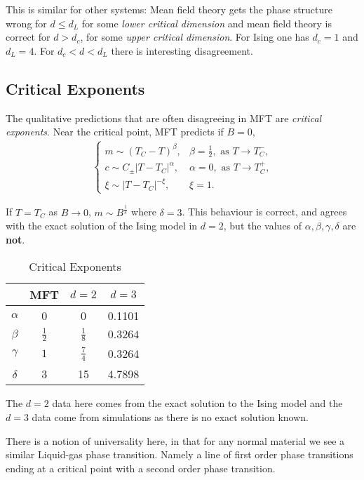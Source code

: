 This is similar for other systems: Mean field theory gets the phase structure wrong for $d \leq d_L$ for some \textit{lower critical dimension} and mean field theory is correct for $d > d_{c}$, for some \textit{upper critical dimension}. For Ising one has $d_c = 1$ and $d_L = 4$. For $d_c < d < d_L$ there is interesting disagreement.

\subsection{Critical Exponents}


The qualitative predictions that are often disagreeing in MFT are \textit{critical exponents}. Near the critical point, MFT predicts if $B = 0$,
\begin{align}
    \begin{cases}
        m \sim  \left( T_C - T \right)^{\beta}, & \beta = \frac{1}{2}, \text{~as $T \to T_C^{-}$,} \\
        c \sim C_{\pm} \left| T - T_C \right|^{\alpha}, & \alpha = 0, \text{~as $T \to T_C^{+}$,}\\
        \xi \sim  \left| T - T_C \right|^{-\xi}, & \xi = 1. 
    \end{cases}
\end{align}

If $T = T_C$ as $B \to 0$, $m \sim  B^{\frac{1}{\delta}}$ where $\delta = 3$. This behaviour is correct, and agrees with the exact solution of the Ising model in $d = 2$, but the values of $\alpha , \beta , \gamma, \delta$ are \textbf{not}.

\begin{table}[h]
    \centering
    \caption{Critical Exponents}
    \label{tab:ce}
    \begin{tabular}{c|ccc}
     & MFT & $d= 2$ & $d = 3$ \\
     \midrule
        $\alpha$ & 0 & 0 & 0.1101 \\
        $\beta$ & $\frac{1}{2}$ & $\frac{1}{8}$ & $0.3264$ \\
        $\gamma$ & $1$ & $\frac{7}{4}$ & 0.3264 \\
        $\delta$ & 3 & 15 & 4.7898
    \end{tabular}
\end{table}

The $d = 2$ data here comes from the exact solution to the Ising model and the $d = 3$ data come from simulations as there is no exact solution known.

There is a notion of universality here, in that for any normal material we see a similar Liquid-gas phase transition. Namely a line of first order phase transitions ending at a critical point with a second order phase transition.

